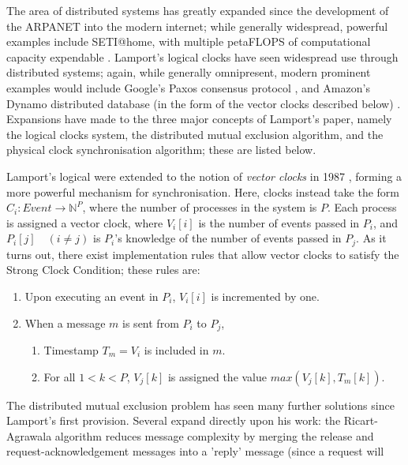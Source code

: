 \documentclass[11pt]{article}
\begin{document}
The area of distributed systems has greatly expanded since the development of
the ARPANET into the modern internet; while generally widespread, powerful 
examples include SETI@home, with multiple petaFLOPS of computational capacity
expendable \cite{anderson2002seti}. Lamport's logical clocks have seen
widespread use through distributed systems; again, while generally omnipresent,
modern prominent examples would include Google's Paxos consensus protocol
\cite{lamport2001paxos}, and Amazon's Dynamo distributed database (in the form
of the vector clocks described below) \cite{decandia2007dynamo}. Expansions have
made to the three major concepts of Lamport's paper, namely the logical clocks
system, the distributed mutual exclusion algorithm, and the physical clock
synchronisation algorithm; these are listed below.
\par
Lamport's logical were extended to the notion of \textit{vector clocks} in 1987
\cite{fidge1987timestamps}, forming a more powerful mechanism for
synchronisation. Here, clocks instead take the form \( C_i : Event \rightarrow
\mathbb{N}^P \), where the number of processes in the system is \( P \). Each
process is assigned a vector clock, where \( V_i[i] \) is the number of events
passed in \( P_i \), and \( P_i[j] \quad (i \neq j) \) is \( P_i \)'s knowledge of the
number of events passed in \( P_j \). As it turns out, there exist
implementation rules that allow vector clocks to satisfy the Strong Clock
Condition; these rules are:
\begin{enumerate}
    \item Upon executing an event in \( P_i \), \( V_i[i] \) is incremented by
        one.
    \item When a message \( m \) is sent from \( P_i \) to \( P_j \),
    \begin{enumerate}
        \item Timestamp \( T_m = V_i \) is included in \( m \).
        \item For all \( 1 < k < P \), \( V_j[k] \) is assigned the value
            \( max(V_j[k], T_m[k]) \).
    \end{enumerate}
\end{enumerate}
\par
The distributed mutual exclusion problem has seen many further solutions since
Lamport's first provision. Several expand directly upon his work: the
Ricart-Agrawala algorithm reduces message complexity by merging the release and
request-acknowledgement messages into a 'reply' message (since a request will
\end{document}

